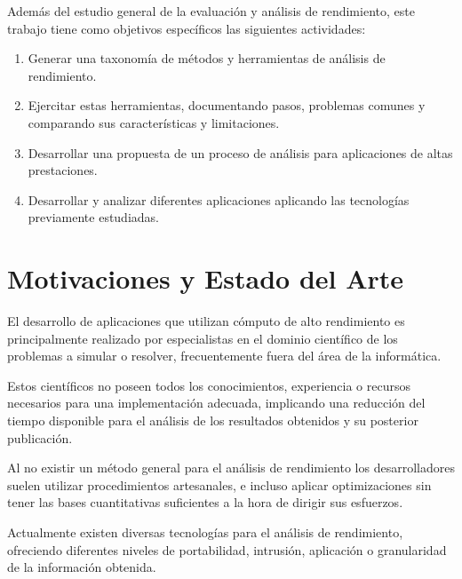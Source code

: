 \documentclass[a4paper]{article}
\begin{document}
  \smallskip

  Adem\'as del estudio general de la evaluaci\'on y an\'alisis de rendimiento,
  este trabajo tiene como objetivos espec\'ificos las siguientes actividades:

  \smallskip

  \begin{enumerate}
  \item Generar una taxonom\'ia de m\'etodos y herramientas de an\'alisis de
    rendimiento.
  \item Ejercitar estas herramientas, documentando pasos, problemas comunes y
    comparando sus caracter\'isticas y limitaciones.
  \item Desarrollar una propuesta de un proceso de an\'alisis para aplicaciones
    de altas prestaciones.
  \item Desarrollar y analizar diferentes aplicaciones aplicando las
    tecnolog\'ias previamente estudiadas.
  \end{enumerate}
  
\section{Motivaciones y Estado del Arte}

El desarrollo de aplicaciones que utilizan c\'omputo de alto rendimiento es
principalmente realizado por especialistas en el dominio cient\'ifico de los
problemas a simular o resolver, frecuentemente fuera del \'area de la
inform\'atica.

\smallskip

Estos cient\'ificos no poseen todos los conocimientos, experiencia o recursos
necesarios para una implementaci\'on adecuada, implicando una reducci\'on del
tiempo disponible para el an\'alisis de los resultados obtenidos y su
posterior publicaci\'on.

\smallskip

Al no existir un m\'etodo general para el an\'alisis de rendimiento los
desarrolladores suelen utilizar procedimientos artesanales, e incluso aplicar
optimizaciones sin tener las bases cuantitativas suficientes a la hora de
dirigir sus esfuerzos.

\smallskip

Actualmente existen diversas tecnolog\'ias para el an\'alisis de rendimiento,
ofreciendo diferentes niveles de portabilidad, intrusi\'on, aplicaci\'on o
granularidad de la informaci\'on obtenida.

\smallskip
\end{document}
